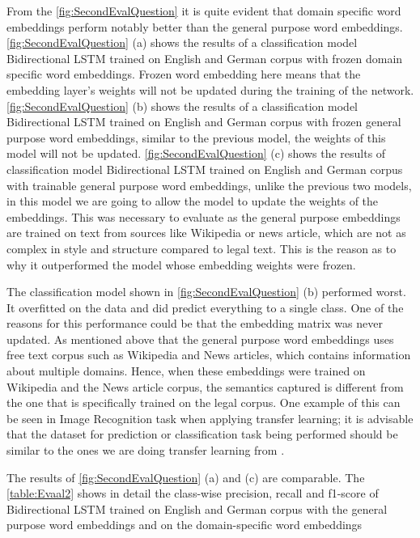 From the \ref{fig:SecondEvalQuestion} it is quite evident that domain specific word embeddings perform notably better than the general purpose word embeddings. \ref{fig:SecondEvalQuestion} (a) shows the results of a classification model Bidirectional LSTM trained on English and German corpus with frozen domain specific word embeddings. Frozen word embedding here means that the embedding layer's weights will not be updated during the training of the network. \ref{fig:SecondEvalQuestion} (b) shows the results of a classification model Bidirectional LSTM trained on English and German corpus with frozen general purpose word embeddings, similar to the previous model, the weights of this model will not be updated. \ref{fig:SecondEvalQuestion} (c) shows the results of classification model Bidirectional LSTM trained on English and German corpus with trainable general purpose word embeddings, unlike the previous two models, in this model we are going to allow the model to update the weights of the embeddings. This was necessary to evaluate as the general purpose embeddings are trained on text from sources like Wikipedia or news article, which are not as complex in style and structure compared to legal text. This is the reason as to why it outperformed the model whose embedding weights were frozen. 

The classification model shown in \ref{fig:SecondEvalQuestion} (b) performed worst. It overfitted on the data and did predict everything to a single class. One of the reasons for this performance could be that the embedding matrix was never updated. As mentioned above that the general purpose word embeddings uses free text corpus such as Wikipedia and News articles, which contains information about multiple domains. Hence, when these embeddings were trained on Wikipedia and the News article corpus, the semantics captured is different from the one that is specifically trained on the legal corpus. One example of this can be seen in Image Recognition task when applying transfer learning; it is advisable that the dataset for prediction or classification task being performed should be similar to the ones we are doing transfer learning from \cite{iglovikov2018ternausnet}.


The results of \ref{fig:SecondEvalQuestion} (a) and (c) are comparable. The \ref{table:Evaal2} shows in detail the class-wise precision, recall and f1-score of Bidirectional LSTM trained on English and German corpus with the general purpose word embeddings and on the domain-specific word embeddings

